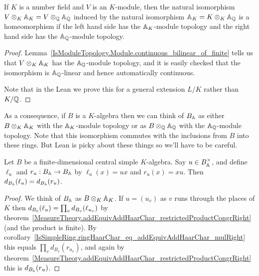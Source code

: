 \begin{corollary}
  \label{NumberField.AdeleRing.ModuleBaseChangeContinuousAddEquiv}
  \leanok
  If $K$ is a number field and $V$ is an $K$-module, then
  the natural isomorphism $V\otimes_K\mathbb{A}_K=V\otimes_{\mathbb{Q}}\mathbb{A}_{\mathbb{Q}}$ induced by the natural
  isomorphism $\mathbb{A}_K=K\otimes_K\mathbb{A}_{\mathbb{Q}}$ is a homeomorphism if the left hand side has the $\mathbb{A}_K$-module
  topology and the right hand side has the $\mathbb{A}_{\mathbb{Q}}$-module topology.
\end{corollary}
\begin{proof}
  Lemma~\ref{IsModuleTopology.Module.continuous_bilinear_of_finite} tells us that $V\otimes_K\mathbb{A}_K$
  has the $\mathbb{A}_{\mathbb{Q}}$-module topology, and it is easily checked that the isomorphism is
  $\mathbb{A}_{\mathbb{Q}}$-linear and hence automatically continuous.

  Note that in the Lean we prove this for a general extension $L/K$ rather than $K/\mathbb{Q}$.
\end{proof}

As a consequence, if $B$ is a $K$-algebra then we can think of $B_{\mathbb{A}}$ as either $B\otimes_K\mathbb{A}_K$
with the $\mathbb{A}_K$-module topology or as $B\otimes_{\mathbb{Q}}\mathbb{A}_{\mathbb{Q}}$ with the $\mathbb{A}_{\mathbb{Q}}$-module
topology. Note that this isomorphism commutes with the inclusions from $B$ into these rings.
But Lean is picky about these things so we'll have to be careful.

\begin{theorem}
  \label{NumberField.AdeleRing.isCentralSimple_addHaarScalarFactor_left_mul_eq_right_mul}
  \leanok
  Let $B$ be a finite-dimensional central simple $K$-algebra.
  Say $u\in B_{\mathbb{A}}^\times$, and define $\ell_u$ and $r_u:B_{\mathbb{A}}\to B_{\mathbb{A}}$ by
  $\ell_u(x)=ux$ and $r_u(x)=xu$. Then $d_{B_{\mathbb{A}}}(\ell_u)=d_{B_{\mathbb{A}}}(r_u)$.
\end{theorem}
\begin{proof}
  We think of $B_{\mathbb{A}}$ as $B\otimes_K\mathbb{A}_K$.
  If $u=(u_v)$ as $v$ runs through the places of $K$ then
  $d_{B_{\mathbb{A}}}(\ell_u)=\prod_v d_{B_v}(\ell_{u_v})$ by
  theorem~\ref{MeasureTheory.addEquivAddHaarChar_restrictedProductCongrRight} (and the product is finite).
  By corollary~\ref{IsSimpleRing.ringHaarChar_eq_addEquivAddHaarChar_mulRight}
  this equals $\prod_v d_{B_v}(r_{u_v})$, and again by
  theorem~\ref{MeasureTheory.addEquivAddHaarChar_restrictedProductCongrRight} this is $d_{B_{\mathbb{A}}}(r_u)$.
\end{proof}

